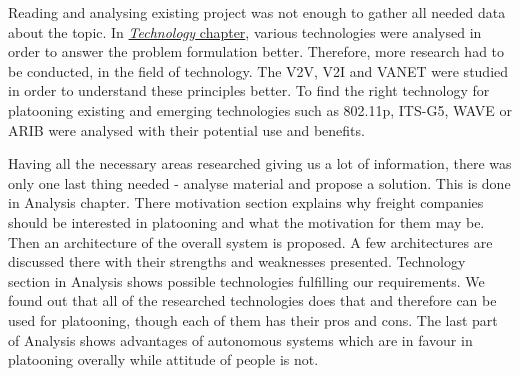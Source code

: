 %
Reading and analysing existing project was not enough to gather all needed data about the topic. In \hyperref[sec:technology]{\textit{Technology} chapter}, various technologies were analysed in order to answer the problem formulation better. Therefore, more research had to be conducted, in the field of technology. The V2V, V2I and VANET were studied in order to understand these principles better. To find the right technology for platooning existing and emerging technologies such as 802.11p, ITS-G5, WAVE or ARIB were analysed with their potential use and benefits. \par
%
Having all the necessary areas researched giving us a lot of information, there was only one last thing needed - analyse material and propose a solution. This is done in Analysis chapter. There motivation section explains why freight companies should be interested in platooning and what the motivation for them may be. Then an architecture of the overall system is proposed. A few architectures are discussed there with their strengths and weaknesses presented. Technology section in Analysis shows possible technologies fulfilling our requirements. We found out that all of the researched technologies does that and therefore can be used for platooning, though each of them has their pros and cons. The last part of Analysis shows advantages of autonomous systems which are in favour in platooning overally while attitude of people is not. \par
%